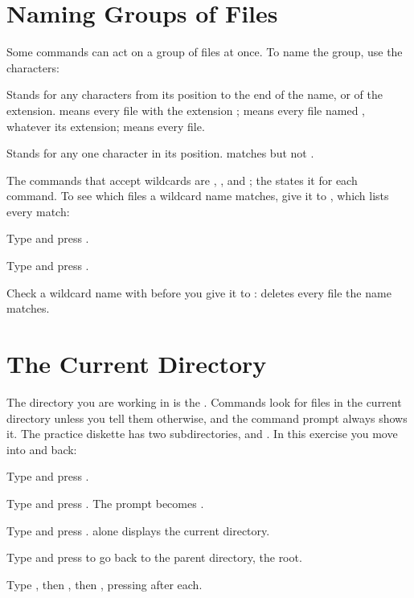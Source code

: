 \section{Naming Groups of Files}
Some commands can act on a group of files at once.  To name the group, use
the  characters:

Stands for any characters from its position to the
end of the name, or of the extension.   means every file with
the extension ;  means every file named ,
whatever its extension;  means every file.

Stands for any one character in its position.
 matches  but not .

The commands that accept wildcards are , ,
 and ; the  states it
for each command.  To see which files a wildcard name matches, give it to
, which lists every match:
\begin{Steps}
\item Type  and press .
\item Type  and press .
\end{Steps}


\begin{Important}
Check a wildcard name with  before you give it to :
 deletes every file the name matches.
\end{Important}

\section{The Current Directory}
The directory you are working in is the .  Commands
look for files in the current directory unless you tell them otherwise, and
the command prompt always shows it.  The practice diskette has two
subdirectories,  and .  In this exercise you move
into  and back:
\begin{Steps}
\item Type  and press .
\item Type  and press .  The prompt becomes
  .
\item Type  and press .   alone displays the
  current directory.
\item Type  and press  to go back to the parent
  directory, the root.
\item Type , then , then , pressing
   after each.
\end{Steps}

